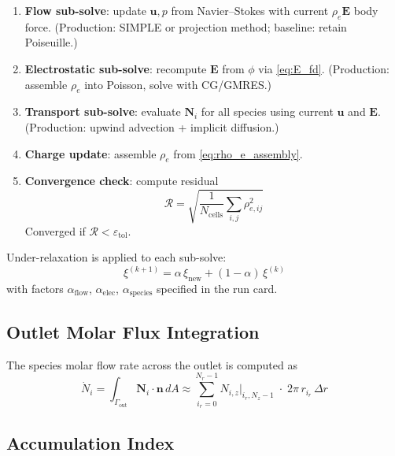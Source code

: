 \documentclass[11pt,a4paper]{article}
\begin{document}
\begin{enumerate}
  \item \textbf{Flow sub-solve}: update $\bm{u}, p$ from Navier--Stokes with
        current $\rho_e \bm{E}$ body force.  (Production: SIMPLE or projection
        method; baseline: retain Poiseuille.)
  \item \textbf{Electrostatic sub-solve}: recompute $\bm{E}$ from $\phi$ via
        \eqref{eq:E_fd}.  (Production: assemble $\rho_e$ into Poisson,
        solve with CG/GMRES.)
  \item \textbf{Transport sub-solve}: evaluate $\bm{N}_i$ for all species
        using current $\bm{u}$ and $\bm{E}$.  (Production: upwind advection
        + implicit diffusion.)
  \item \textbf{Charge update}: assemble $\rho_e$ from \eqref{eq:rho_e_assembly}.
  \item \textbf{Convergence check}: compute residual
        \begin{equation}\label{eq:residual}
          \mathcal{R} = \sqrt{\frac{1}{N_{\mathrm{cells}}}
                        \sum_{i,j}\rho_{e,ij}^2}
        \end{equation}
        Converged if $\mathcal{R} < \varepsilon_{\mathrm{tol}}$.
\end{enumerate}
\label{alg:coupling}

Under-relaxation is applied to each sub-solve:
\begin{equation}\label{eq:underrelax}
  \xi^{(k+1)} = \alpha\,\xi_{\mathrm{new}} + (1 - \alpha)\,\xi^{(k)}
\end{equation}
with factors $\alpha_{\mathrm{flow}}$, $\alpha_{\mathrm{elec}}$,
$\alpha_{\mathrm{species}}$ specified in the run card.

\subsection{Outlet Molar Flux Integration}

The species molar flow rate across the outlet is computed as
\begin{equation}\label{eq:outlet_flux}
  \dot{N}_i = \int_{\Gamma_{\mathrm{out}}} \bm{N}_i\cdot\bm{n}\,dA
  \approx \sum_{i_r=0}^{N_r-1} N_{i,z}\big|_{i_r,N_z-1}\;
           \cdot\; 2\pi\,r_{i_r}\,\Delta r
\end{equation}

\subsection{Accumulation Index}
\end{document}
